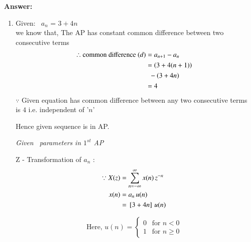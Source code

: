 \documentclass[journal,12pt,twocolumn]{IEEEtran}
\theoremstyle{remark}
\begin{document}
\vspace{0.5cm}
\textbf{Answer:} 
\begin{enumerate} [label=(\roman*)]
    \item Given: $\,$ $a_n$ = $3 + 4n$ \\
    we know that, The AP has constant common difference between two consecutive terms
    \begin{align}
        \therefore \text{common difference } (d) &= a_{n+1} - a_n \\
        &= \left(3+4(n+1)\right) \nonumber\\
        & \,\,\, -\left(3+4n\right) \nonumber\\
        &= 4
    \end{align}
   $\because$ Given equation has common difference between any two consecutive terms is $4$ i.e. independent of '$n$'
   \begin{center}
       Hence given sequence is in AP.
   \end{center}
   \vspace{0.3cm}

    \begin{table}[htbp] 
    \centering
    
    \vspace{0.2cm}
    \caption{\normalsize\textsl{Given \, parameters in $1^{st}$ AP}}
    \label{given parameters list}
    \end{table}

    Z - Transformation of $a_n$ :
    \begin{align}
        \because X(z) &= \sum_{n = -\infty}^{\infty}x(n) \, z^{-n} \\
         x(n)&= a_n\,u(n) \\
        & = {}\left[3+4n\right] \, u(n)
    \end{align}

    \[
    \text{Here},\, u(n) =
    \begin{cases}
        0 & \text{for } n < 0 \\
        1 & \text{for } n \geq 0 
    \end{cases}
    \]


\end{enumerate}
\end{document}
